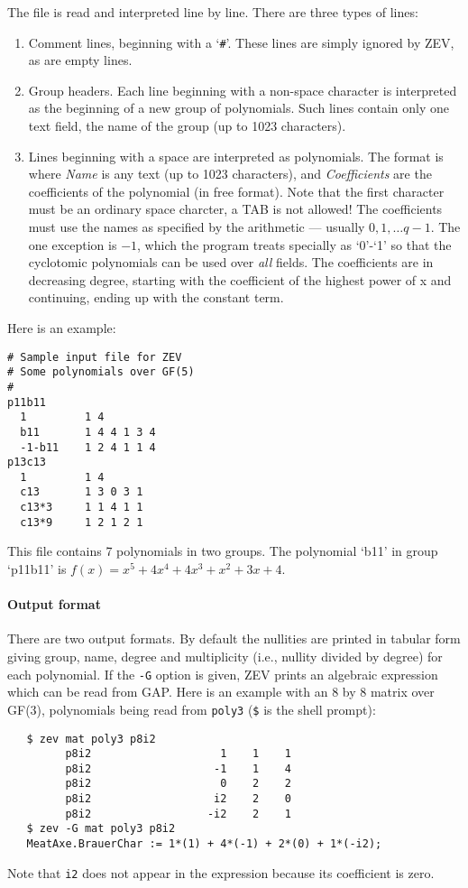 The file is read and interpreted line by line. There are three
types of lines:
\begin{enumerate}
\item Comment lines, beginning with a `{\tt \#}'. These lines
      are simply ignored by ZEV, as are empty lines.
\item Group headers. Each line beginning with a non-space character
      is interpreted as the beginning of a new group of polynomials.
      Such lines contain only one text field, the name of the group
      (up to 1023 characters).
\item Lines beginning with a space are interpreted as polynomials.
      The format is
      where {\it Name} is any text (up to 1023 characters), and
      {\it Coefficients} are the coefficients of the polynomial (in
      free format). Note that the first character must be an ordinary
      space charcter, a TAB is not allowed!
      The coefficients must use the names as specified by the arithmetic
      --- usually $0,1,\ldots q-1$.  The one exception is $-1$, which
      the program treats specially as `0'-`1' so that the cyclotomic
      polynomials can be used over {\em all} fields. The coefficients
      are in decreasing degree, starting with the coefficient of the
      highest power of x and continuing, ending up with the constant
      term.
\end{enumerate}


\noindent Here is an example:
\begin{verbatim}
# Sample input file for ZEV
# Some polynomials over GF(5)
#
p11b11
  1         1 4
  b11       1 4 4 1 3 4
  -1-b11    1 2 4 1 1 4
p13c13
  1         1 4
  c13       1 3 0 3 1
  c13*3     1 1 4 1 1
  c13*9     1 2 1 2 1
\end{verbatim}
This file contains 7 polynomials in two groups. The polynomial
`b11' in group `p11b11' is $f(x)=x^5+4x^4+4x^3+x^2+3x+4$.


\paragraph{Output format}
There are two output formats. By default the nullities are printed in
tabular form giving group, name, degree and multiplicity (i.e., nullity
divided by degree) for each
polynomial. If the {\tt -G} option is given, ZEV prints an algebraic
expression which can be read from GAP.
Here is an example with an 8 by 8 matrix over GF(3), polynomials being
read from {\tt poly3} ({\tt \$} is the shell prompt):
\begin{verbatim}
   $ zev mat poly3 p8i2
         p8i2                    1    1    1
         p8i2                   -1    1    4
         p8i2                    0    2    2
         p8i2                   i2    2    0
         p8i2                  -i2    2    1
   $ zev -G mat poly3 p8i2
   MeatAxe.BrauerChar := 1*(1) + 4*(-1) + 2*(0) + 1*(-i2);
\end{verbatim}
Note that {\tt i2} does not appear in the expression because its
coefficient is zero.

